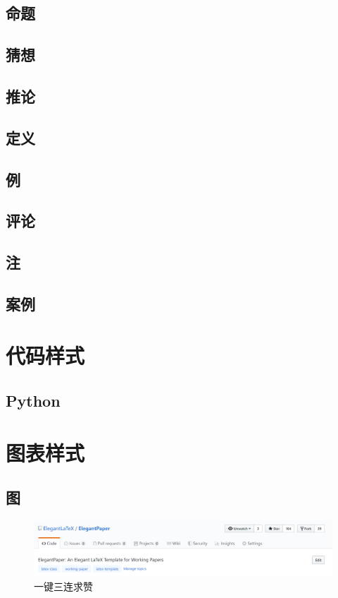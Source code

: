 \subsection{命题}
\subsection{猜想}
\subsection{推论}
\subsection{定义}
\subsection{例}
\subsection{评论}
\subsection{注}
\subsection{案例}
\clearpage
\section[代码样式]{代码样式}
\subsection{Python}

\clearpage
\section[图表样式]{图表样式}
\subsection{图}
\lipsum[1]
\begin{figure}[htbp]
    \centering
    \includegraphics[width=\textwidth]{image/star.png}
    \caption{一键三连求赞}
\end{figure}
\lipsum[2]
